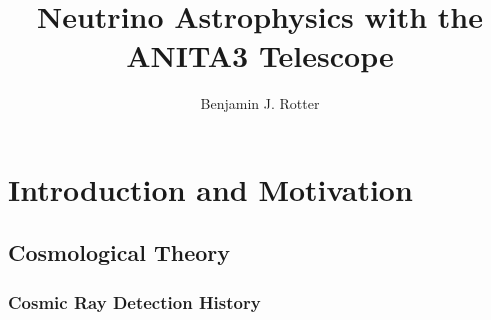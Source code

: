 \documentclass[11pt]{uhthesis}
\title{Neutrino Astrophysics with the ANITA3 Telescope}
\author{Benjamin J. Rotter}
\begin{document}
\maketitle

\begin{frontmatter}



%

%

%

\tableofcontents



\end{frontmatter}


%


%
%
%



\chapter{Introduction and Motivation}


\section{Cosmological Theory}
	\subsection{Cosmic Ray Detection History}
	
\end{document}
